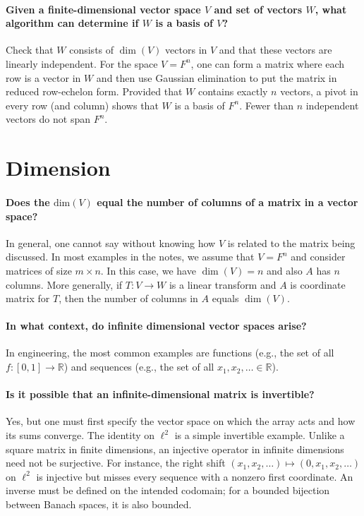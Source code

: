 \documentclass[10pt,english]{article}
\begin{document}
\paragraph{Given a finite-dimensional vector space $V$ and set of vectors $W$, what algorithm can determine if $W$ is a basis of $V$?}
Check that $W$ consists of $\dim(V)$ vectors in $V$ and that these vectors are linearly independent.
For the space $V=F^n$, one can form a matrix where each row is a vector in $W$ and then use Gaussian elimination to put the matrix in reduced row-echelon form.
Provided that $W$ contains exactly $n$ vectors, a pivot in every row (and column) shows that $W$ is a basis of $F^n$. Fewer than $n$ independent vectors do not span $F^n$.

\section{Dimension}

\paragraph{Does the $\mathrm{dim}(V)$ equal the number of columns of a matrix in a vector space?}
In general, one cannot say without knowing how $V$ is related to the matrix being discussed.
In most examples in the notes, we assume that $V=F^n$ and consider matrices of size $m \times n$.
In this case, we have $\dim(V)=n$ and also $A$ has $n$ columns.
More generally, if $T\colon V \to W$ is a linear transform and $A$ is coordinate matrix for $T$, then the number of columns in $A$ equals $\dim(V)$.


\paragraph{In what context, do infinite dimensional vector spaces arise?}

In engineering, the most common examples are functions (e.g., the set of all $f\colon [0,1] \to \mathbb{R}$) and sequences (e.g., the set of all $x_1,x_2,\ldots \in \mathbb{R}$).

\paragraph{Is it possible that an infinite-dimensional matrix is invertible?}


Yes, but one must first specify the vector space on which the array acts and how its sums converge.
The identity on $\ell^2$ is a simple invertible example.
Unlike a square matrix in finite dimensions, an injective operator in infinite dimensions need not be surjective.
For instance, the right shift $(x_1,x_2,\ldots)\mapsto(0,x_1,x_2,\ldots)$ on $\ell^2$ is injective but misses every sequence with a nonzero first coordinate.
An inverse must be defined on the intended codomain; for a bounded bijection between Banach spaces, it is also bounded.
\end{document}
